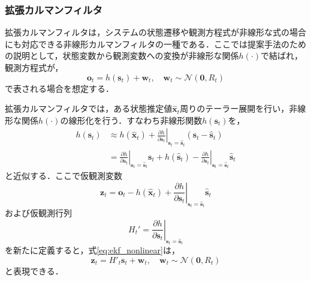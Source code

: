         \subsubsection{拡張カルマンフィルタ}
        拡張カルマンフィルタ\cite{bishop2001introduction}は，システムの状態遷移や観測方程式が非線形な式の場合にも対応できる非線形カルマンフィルタの一種である．ここでは提案手法のための説明として，状態変数から観測変数への変換が非線形な関係$h(\cdot)$で結ばれ，観測方程式が，
        \begin{equation}
            \label{eq:ekf_nonlinear}
            \bm{o}_t = h(\bm{s}_t) + \bm{w}_t, \quad \bm{w}_t \sim \mathcal{N}(\bm{0}, R_t)
        \end{equation}
        で表される場合を想定する．

        拡張カルマンフィルタでは，ある状態推定値$\hat{\bm{x}}_t$周りのテーラー展開を行い，非線形な関係$h(\cdot)$の線形化を行う．すなわち非線形関数$h(\bm{s}_t)$を，
        \begin{equation}
            \label{eq:ekf_linearization}
            \begin{aligned}
                h(\bm{s}_t) &\approx h(\hat{\bm{x}}_t) + \left.\frac{\partial h}{\partial \bm{s}_t}\right|_{\bm{s}_t = \hat{\bm{s}}_t} (\bm{s}_t - \hat{\bm{s}}_t)
                \\ &= \left.\frac{\partial h}{\partial \bm{s}_t}\right|_{\bm{s}_t = \hat{\bm{s}}_t} \bm{s}_t + h(\hat{\bm{s}}_t) - \left.\frac{\partial h}{\partial \bm{s}_t}\right|_{\bm{s}_t = \hat{\bm{s}}_t} \hat{\bm{s}}_t
            \end{aligned}
        \end{equation}
        と近似する．ここで仮観測変数
        \begin{equation}
            \label{eq:ekf_new_observation}
            \bm{z}_t = \bm{o}_t - h(\hat{\bm{x}}_t) + \left.\frac{\partial h}{\partial \bm{s}_t}\right|_{\bm{s}_t = \hat{\bm{s}}_t} \hat{\bm{s}}_t
        \end{equation}
        および仮観測行列
        \begin{equation}
            \label{eq:ekf_new_observation_matrix}
            H_t' = \left.\frac{\partial h}{\partial \bm{s}_t}\right|_{\bm{s}_t = \hat{\bm{s}}_t}
        \end{equation}
        を新たに定義すると，式\ref{eq:ekf_nonlinear}は，
        \begin{equation}
            \label{eq:ekf_linearization_with_z}
            \bm{z}_t = H'_t \bm{s}_t + \bm{w}_t, \quad \bm{w}_t \sim \mathcal{N}(\bm{0}, R_t) 
        \end{equation}
        と表現できる．


